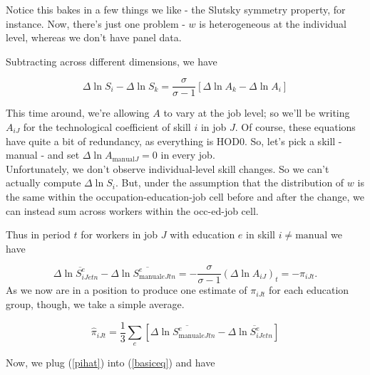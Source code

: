 \documentclass[12pt]{article}
\begin{document}
Notice this bakes in a few things we like - the Slutsky symmetry property, for instance. Now, there's just one problem - $w$ is heterogeneous at the individual level, whereas we don't have panel data.


Subtracting across different dimensions, we have




\begin{equation}
\Delta \ln S_i - \Delta \ln S_k=\frac{\sigma}{\sigma-1}\left[    \Delta \ln A_k-   \Delta \ln A_i \right]
\end{equation}

This time around, we're allowing $A$ to vary at the job level; so we'll be writing $A_{iJ}$ for the technological coefficient of skill $i$ in job $J$. Of course, these equations have quite a bit of redundancy, as everything is HOD0. So, let's pick a skill - manual - and set $\Delta \ln A_{\text{manual}J}=0$ in every job. \vspace{3mm}\\

Unfortunately, we don't observe individual-level skill changes. So we can't actually compute $\Delta \ln S_i$. But, under the assumption that the distribution of $w$ is the same within the occupation-education-job cell before and after the change, we can instead sum across workers within the occ-ed-job cell.



Thus in period $t$ for workers in job $J$ with education $e$ in skill $i\not =\text{manual}$ we have

\begin{equation}
\Delta \overline{\ln S^e_{iJetn}}-\Delta \overline{\ln S^e_{\text{manual}eJtn}} =-\frac{\sigma}{\sigma-1}(\Delta \ln A_{iJ})_t= -\pi_{iJt}.
\end{equation}
As we now are in a position to produce one estimate of $\pi_{iJt}$ for each education group, though, we take a simple average.

\begin{equation}\label{pihat}
\hat{\pi}_{iJt}=\frac{1}{3}\sum_{e}\left[\Delta \overline{\ln S^e_{\text{manual}eJtn}}-\Delta \overline{\ln S^e_{iJetn}} \right]
\end{equation}

Now, we plug (\ref{pihat}) into (\ref{basiceq}) and have 
\end{document}
